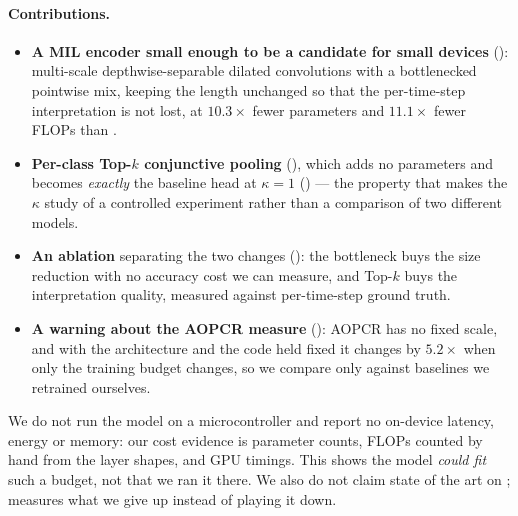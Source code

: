 \paragraph{Contributions.}
\begin{itemize}
  \item \textbf{A MIL encoder small enough to be a candidate for small devices}
        (): multi-scale depthwise-separable dilated convolutions with a
        bottlenecked pointwise mix, keeping the length unchanged so that the per-time-step
        interpretation is not lost, at $10.3\times$ fewer parameters and $11.1\times$ fewer FLOPs
        than \millet{}.
  \item \textbf{Per-class Top-$k$ conjunctive pooling} (), which adds no
        parameters and becomes \emph{exactly} the baseline head at $\kappa = 1$
        () --- the property that makes the $\kappa$ study of 
        a controlled experiment rather than a comparison of two different models.
  \item \textbf{An ablation} separating the two changes (): the bottleneck
        buys the size reduction with no accuracy cost we can measure, and \mbox{Top-$k$} buys the
        interpretation quality, measured against per-time-step ground truth.
  \item \textbf{A warning about the AOPCR measure} (): AOPCR has no fixed scale,
        and with the architecture and the code held fixed it changes by $5.2\times$ when only the
        training budget changes, so we compare only against baselines we retrained ourselves.
\end{itemize}

\noindent We do not run the model on a microcontroller and report no on-device latency, energy or
memory: our cost evidence is parameter counts, FLOPs counted by hand from the layer shapes, and GPU
timings. This shows the model \emph{could fit} such a budget, not that we ran it there. We also do
not claim state of the art on \ucr{};  measures what we give up instead of playing
it down.
